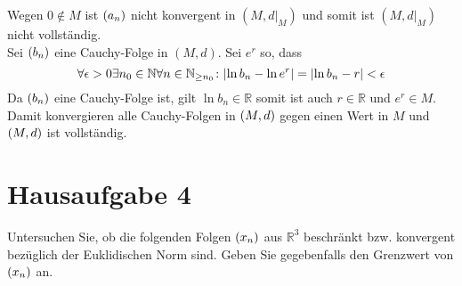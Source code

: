 \documentclass{article}
\begin{document}
\begin{enumerate}[(i)]
  Wegen $0 \notin M$ ist $\qty(a_n)$ nicht konvergent in $(M, d|_M)$ und somit ist $(M, d|_M)$
  nicht vollständig. \\

  Sei $\qty(b_n)$ eine Cauchy-Folge in $(M, d)$.
  Sei $e^r$ so, dass
  \[
    \forall \epsilon > 0 \exists n_0 \in \mathbb{N} \forall n \in \mathbb{N}_{\geq n_0} \colon
    \abs{\ln b_n - \ln e^r} = \abs{\ln b_n - r} < \epsilon
  \]
  Da $\qty(b_n)$ eine Cauchy-Folge ist, gilt $\ln b_n \in \mathbb{R}$ somit ist auch $r \in \mathbb{R}$
  und $e^r \in M$.
  Damit konvergieren alle Cauchy-Folgen in $\qty(M, d)$ gegen einen Wert in $M$ und $\qty(M, d)$
  ist vollständig.

\end{enumerate}

\section*{Hausaufgabe 4}

Untersuchen Sie, ob die folgenden Folgen $\qty(x_n)$ aus $\mathbb{R}^3$ beschränkt bzw.
konvergent bezüglich der Euklidischen Norm sind.
Geben Sie gegebenfalls den Grenzwert von $\qty(x_n)$ an.
\end{document}
